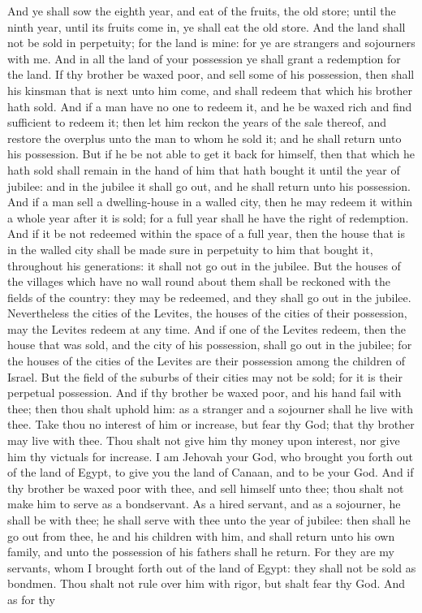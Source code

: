 And ye shall sow the eighth year, and eat of the fruits, the old store; until the ninth year, until its fruits come in, ye shall eat the old store.  And the land shall not be sold in perpetuity; for the land is mine: for ye are strangers and sojourners with me. And in all the land of your possession ye shall grant a redemption for the land. If thy brother be waxed poor, and sell some of his possession, then shall his kinsman that is next unto him come, and shall redeem that which his brother hath sold. And if a man have no one to redeem it, and he be waxed rich and find sufficient to redeem it; then let him reckon the years of the sale thereof, and restore the overplus unto the man to whom he sold it; and he shall return unto his possession. But if he be not able to get it back for himself, then that which he hath sold shall remain in the hand of him that hath bought it until the year of jubilee: and in the jubilee it shall go out, and he shall return unto his possession.  And if a man sell a dwelling-house in a walled city, then he may redeem it within a whole year after it is sold; for a full year shall he have the right of redemption. And if it be not redeemed within the space of a full year, then the house that is in the walled city shall be made sure in perpetuity to him that bought it, throughout his generations: it shall not go out in the jubilee. But the houses of the villages which have no wall round about them shall be reckoned with the fields of the country: they may be redeemed, and they shall go out in the jubilee. Nevertheless the cities of the Levites, the houses of the cities of their possession, may the Levites redeem at any time. And if one of the Levites redeem, then the house that was sold, and the city of his possession, shall go out in the jubilee; for the houses of the cities of the Levites are their possession among the children of Israel. But the field of the suburbs of their cities may not be sold; for it is their perpetual possession.  And if thy brother be waxed poor, and his hand fail with thee; then thou shalt uphold him: as a stranger and a sojourner shall he live with thee. Take thou no interest of him or increase, but fear thy God; that thy brother may live with thee. Thou shalt not give him thy money upon interest, nor give him thy victuals for increase. I am Jehovah your God, who brought you forth out of the land of Egypt, to give you the land of Canaan, and to be your God.  And if thy brother be waxed poor with thee, and sell himself unto thee; thou shalt not make him to serve as a bondservant. As a hired servant, and as a sojourner, he shall be with thee; he shall serve with thee unto the year of jubilee: then shall he go out from thee, he and his children with him, and shall return unto his own family, and unto the possession of his fathers shall he return. For they are my servants, whom I brought forth out of the land of Egypt: they shall not be sold as bondmen. Thou shalt not rule over him with rigor, but shalt fear thy God. And as for thy 